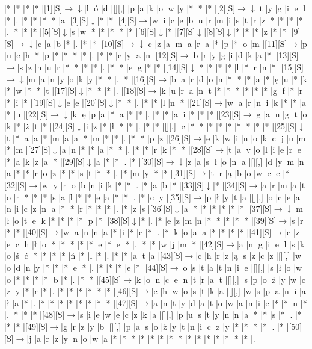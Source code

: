 \documentclass[11pt]{article}
\newcommand\drarr{$\rightarrow \!\!\!\!\! \downarrow$}
\newcommand\rarr{$\rightarrow$}
\newcommand\darr{$\downarrow$}
\begin{document}
\noindent\begin{Puzzle}{25}{28}|*	|*	|*	|*	|[1][S]\drarr	|l	|ó	|d	|[][,]{ }	|p	|a	|k	|o	|w	|y	|*	|*	|*	|[2][S]\drarr	|t	|y	|g	|i	|e	|l	|*	|.
|*	|*	|*	|*	|a	|[3][S]\darr	|*	|*	|[4][S]\rarr	|w	|i	|c	|e	|b	|u	|r	|m	|i	|s	|t	|r	|z	|*	|*	|*	|*	|.
|*	|*	|*	|[5][S]\darr	|s	|w	|*	|*	|*	|*	|*	|[6][S]\darr	|*	|[7][S]\darr	|[8][S]\darr	|*	|*	|*	|z	|*	|*	|[9][S]\drarr	|c	|a	|b	|*	|.
|*	|*	|[10][S]\drarr	|c	|z	|a	|m	|a	|r	|a	|*	|p	|*	|o	|m	|[11][S]\rarr	|p	|u	|c	|h	|*	|p	|*	|*	|*	|*	|.
|*	|*	|c	|y	|a	|n	|[12][S]\rarr	|b	|r	|y	|g	|i	|d	|k	|a	|*	|[13][S]\rarr	|s	|z	|n	|u	|r	|*	|*	|*	|*	|.
|*	|*	|e	|g	|*	|*	|[14][S]\darr	|*	|*	|*	|*	|l	|*	|r	|n	|*	|[15][S]\drarr	|m	|a	|n	|y	|o	|k	|y	|*	|*	|.
|*	|[16][S]\rarr	|b	|a	|r	|d	|o	|n	|*	|*	|*	|a	|*	|ę	|u	|*	|k	|*	|w	|*	|*	|t	|[17][S]\darr	|*	|*	|*	|.
|[18][S]\rarr	|k	|u	|r	|a	|n	|t	|*	|*	|*	|*	|*	|*	|g	|f	|*	|r	|*	|i	|*	|[19][S]\darr	|e	|e	|[20][S]\darr	|*	|*	|.
|*	|*	|l	|n	|*	|[21][S]\rarr	|w	|a	|r	|n	|i	|k	|*	|*	|a	|*	|u	|[22][S]\drarr	|k	|ę	|p	|a	|*	|a	|*	|*	|.
|*	|*	|a	|i	|*	|*	|*	|[23][S]\rarr	|g	|a	|n	|g	|t	|o	|k	|*	|ż	|t	|*	|[24][S]\darr	|i	|z	|*	|ł	|*	|*	|.
|*	|*	|[][,]{ }	|c	|*	|*	|*	|*	|*	|*	|*	|*	|*	|[25][S]\darr	|t	|*	|a	|a	|*	|m	|a	|a	|*	|m	|*	|*	|.
|*	|*	|p	|z	|[26][S]\rarr	|e	|k	|w	|i	|n	|o	|k	|c	|j	|u	|m	|*	|m	|[27][S]\darr	|a	|n	|*	|*	|a	|*	|*	|.
|*	|*	|r	|k	|*	|*	|[28][S]\rarr	|t	|a	|v	|o	|l	|i	|e	|r	|e	|*	|a	|k	|z	|a	|*	|[29][S]\darr	|a	|*	|*	|.
|*	|[30][S]\drarr	|z	|a	|s	|ł	|o	|n	|a	|[][,]{ }	|d	|y	|m	|n	|a	|*	|*	|r	|o	|z	|*	|*	|s	|t	|*	|*	|.
|*	|m	|y	|*	|*	|[31][S]\rarr	|t	|r	|ą	|b	|o	|w	|c	|e	|*	|[32][S]\rarr	|w	|y	|r	|o	|b	|n	|i	|k	|*	|*	|.
|*	|a	|b	|*	|[33][S]\darr	|*	|[34][S]\rarr	|a	|r	|m	|a	|t	|o	|r	|*	|*	|*	|s	|a	|l	|*	|*	|e	|a	|*	|*	|.
|*	|c	|y	|[35][S]\rarr	|p	|ł	|y	|t	|a	|[][,]{ }	|o	|c	|e	|a	|n	|i	|c	|z	|n	|a	|*	|*	|r	|*	|*	|*	|.
|*	|z	|s	|[36][S]\darr	|a	|*	|*	|*	|*	|*	|*	|[37][S]\drarr	|m	|ł	|o	|t	|e	|k	|*	|*	|*	|*	|p	|*	|[38][S]\darr	|*	|.
|*	|e	|z	|m	|n	|*	|*	|*	|*	|*	|[39][S]\rarr	|s	|r	|*	|*	|[40][S]\rarr	|w	|a	|n	|n	|a	|*	|i	|*	|c	|*	|.
|*	|k	|o	|a	|a	|*	|*	|*	|*	|[41][S]\rarr	|c	|z	|e	|c	|h	|ł	|o	|*	|*	|*	|*	|*	|e	|*	|e	|*	|.
|*	|*	|w	|j	|m	|*	|[42][S]\rarr	|a	|n	|g	|i	|e	|l	|s	|k	|o	|ś	|ć	|*	|*	|*	|*	|ń	|*	|l	|*	|.
|*	|*	|a	|t	|a	|[43][S]\rarr	|c	|h	|r	|z	|ą	|s	|z	|c	|z	|[][,]{ }	|w	|o	|d	|n	|y	|*	|*	|*	|e	|*	|.
|*	|*	|*	|e	|*	|[44][S]\rarr	|o	|s	|t	|a	|t	|n	|i	|e	|[][,]{ }	|s	|ł	|o	|w	|o	|*	|*	|*	|*	|b	|*	|.
|*	|*	|[45][S]\rarr	|k	|o	|n	|c	|e	|n	|t	|r	|a	|t	|[][,]{ }	|s	|p	|o	|ż	|y	|w	|c	|z	|y	|*	|r	|*	|.
|*	|*	|*	|*	|*	|*	|[46][S]\rarr	|c	|h	|w	|o	|s	|t	|k	|a	|[][,]{ }	|w	|s	|p	|a	|n	|i	|a	|ł	|a	|*	|.
|*	|*	|*	|*	|*	|*	|*	|*	|[47][S]\rarr	|a	|n	|t	|y	|d	|a	|t	|o	|w	|a	|n	|i	|e	|*	|*	|n	|*	|.
|*	|*	|*	|[48][S]\rarr	|s	|i	|e	|w	|e	|c	|z	|k	|a	|[][,]{ }	|p	|u	|s	|t	|y	|n	|n	|a	|*	|*	|s	|*	|.
|*	|*	|*	|[49][S]\rarr	|g	|r	|z	|y	|b	|[][,]{ }	|p	|a	|s	|o	|ż	|y	|t	|n	|i	|c	|z	|y	|*	|*	|*	|*	|.
|*	|[50][S]\rarr	|j	|a	|r	|z	|y	|n	|o	|w	|a	|*	|*	|*	|*	|*	|*	|*	|*	|*	|*	|*	|*	|*	|*	|*	|.\end{Puzzle}
\end{document}
